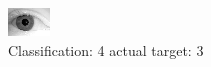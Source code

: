 \begin{figure}[h!]
\begin{center}
\includegraphics[width=0.60\columnwidth]{figures/ID2089_class_4_target_3.png}
\end{center}
\caption{ Classification: 4 actual target: 3}
\label{fig:ID2089_class_4_target_3}
\end{figure}
